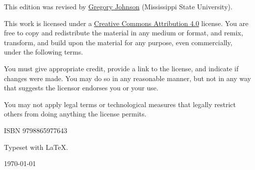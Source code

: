 \noindent This edition was revised by \href{http://loighic.net/}{Gregory Johnson} (Mississippi State University). %


\bigskip
\bigskip

\noindent \footnotesize This work is licensed under a \href{https://creativecommons.org/licenses/by/4.0/}{Creative Commons Attribution 4.0} license. 
You are free to copy and redistribute the material in any medium or format, and  remix, transform, and build upon the material for any purpose, even commercially, under the following terms.
\smallskip

\noindent You must give appropriate credit, provide a link to the license, and indicate if changes were made. You may do so in any reasonable manner, but not in any way that suggests the licensor endorses you or your use.
\smallskip

\noindent You may not apply legal terms or technological measures that legally restrict others from doing anything the license permits.

\normalsize 

\bigskip

\noindent ISBN 9798865977643  %
\medskip
\medskip


\begin{center}

Typeset with \textsf{\LaTeX}.

\bigskip

\today
\end{center}



